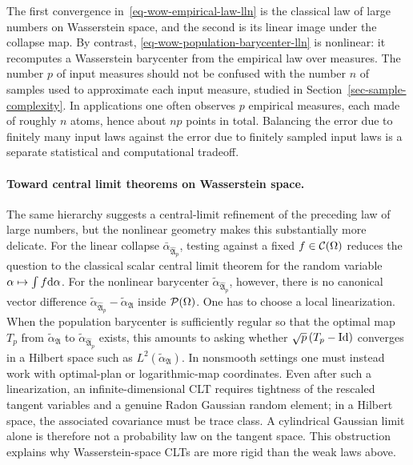 The first convergence in~\eqref{eq-wow-empirical-law-lln} is the classical law of large numbers on Wasserstein space, and the second is its linear image under the collapse map. By contrast, \eqref{eq-wow-population-barycenter-lln} is nonlinear: it recomputes a Wasserstein barycenter from the empirical law over measures. The number $p$ of input measures should not be confused with the number $n$ of samples used to approximate each input measure, studied in Section~\ref{sec-sample-complexity}. In applications one often observes $p$ empirical measures, each made of roughly $n$ atoms, hence about $np$ points in total. Balancing the error due to finitely many input laws against the error due to finitely sampled input laws is a separate statistical and computational tradeoff.

\paragraph{Toward central limit theorems on Wasserstein space.}

The same hierarchy suggests a central-limit refinement of the preceding law of large numbers, but the nonlinear geometry makes this substantially more delicate. For the linear collapse $\bar\alpha_{\widehat{\mathfrak A}_p}$, testing against a fixed $f\in\mathcal{C}(\Omega)$ reduces the question to the classical scalar central limit theorem for the random variable $\alpha\mapsto\int f\mathrm{d}\alpha$. For the nonlinear barycenter $\widetilde\alpha_{\widehat{\mathfrak A}_p}$, however, there is no canonical vector difference $\widetilde\alpha_{\widehat{\mathfrak A}_p}-\widetilde\alpha_{\mathfrak A}$ inside $\mathcal{P}(\Omega)$. One has to choose a local linearization. When the population barycenter is sufficiently regular so that the optimal map $T_p$ from $\widetilde\alpha_{\mathfrak A}$ to $\widetilde\alpha_{\widehat{\mathfrak A}_p}$ exists, this amounts to asking whether $\sqrt p\,(T_p-\mathrm{Id})$ converges in a Hilbert space such as $L^2(\widetilde\alpha_{\mathfrak A})$. In nonsmooth settings one must instead work with optimal-plan or logarithmic-map coordinates. Even after such a linearization, an infinite-dimensional CLT requires tightness of the rescaled tangent variables and a genuine Radon Gaussian random element; in a Hilbert space, the associated covariance must be trace class. A cylindrical Gaussian limit alone is therefore not a probability law on the tangent space. This obstruction explains why Wasserstein-space CLTs are more rigid than the weak laws above.

